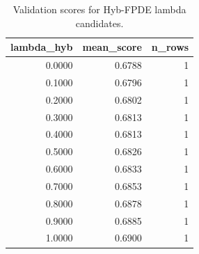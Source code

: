 \begin{table}[t]
\caption{Validation scores for Hyb-FPDE lambda candidates.}
\label{tab:lambda_distribution_computed}
\centering
\begin{tabular}{rrr}
\toprule
lambda\_hyb & mean\_score & n\_rows \\
\midrule
0.0000 & 0.6788 & 1 \\
0.1000 & 0.6796 & 1 \\
0.2000 & 0.6802 & 1 \\
0.3000 & 0.6813 & 1 \\
0.4000 & 0.6813 & 1 \\
0.5000 & 0.6826 & 1 \\
0.6000 & 0.6833 & 1 \\
0.7000 & 0.6853 & 1 \\
0.8000 & 0.6878 & 1 \\
0.9000 & 0.6885 & 1 \\
1.0000 & 0.6900 & 1 \\
\bottomrule
\end{tabular}

\end{table}
